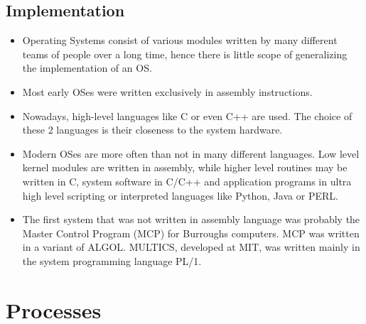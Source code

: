 \documentclass{article}
\theoremstyle{plain}
\theoremstyle{definition}
\begin{document}
\subsection{Implementation}
\begin{itemize}
    \item Operating Systems consist of various modules written by many different teams of people over a long time, hence there is little scope of generalizing the implementation of an OS.
    
    \item Most early OSes were written exclusively in assembly instructions. 
    
    \item Nowadays, high-level languages like C or even C++ are used. The choice of these 2 languages is their closeness to the system hardware. 
    
    \item Modern OSes are more often than not in many different languages. Low level kernel modules are written in assembly, while higher level routines may be written in C, system software in C/C++ and application programs in ultra high level scripting or interpreted languages like Python, Java or PERL. 
    
    \item The first system that was not written in assembly language was probably
the Master Control Program (MCP) for Burroughs computers. MCP was written
in a variant of ALGOL. MULTICS, developed at MIT, was written mainly in
the system programming language PL/1.
\end{itemize}

\section{Processes}
\end{document}
